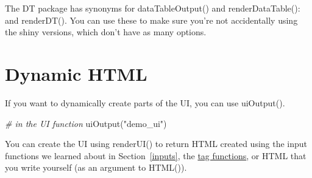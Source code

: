 \documentclass[
]{book}
\newenvironment{Shaded}{\begin{snugshade}}{\end{snugshade}}
\newcommand{\AttributeTok}[1]{\textcolor[rgb]{0.77,0.63,0.00}{#1}}
\newcommand{\CommentTok}[1]{\textcolor[rgb]{0.56,0.35,0.01}{\textit{#1}}}
\newcommand{\DecValTok}[1]{\textcolor[rgb]{0.00,0.00,0.81}{#1}}
\newcommand{\FunctionTok}[1]{\textcolor[rgb]{0.00,0.00,0.00}{#1}}
\newcommand{\NormalTok}[1]{#1}
\newcommand{\OtherTok}[1]{\textcolor[rgb]{0.56,0.35,0.01}{#1}}
\newcommand{\SpecialCharTok}[1]{\textcolor[rgb]{0.00,0.00,0.00}{#1}}
\newcommand{\StringTok}[1]{\textcolor[rgb]{0.31,0.60,0.02}{#1}}
\begin{document}
\begin{Shaded}
\end{Shaded}

The DT package has synonyms for dataTableOutput() and renderDataTable(): and renderDT(). You can use these to make sure you're not accidentally using the shiny versions, which don't have as many options.

\hypertarget{dynamic-html}{%
\section{Dynamic HTML}\label{dynamic-html}}

If you want to dynamically create parts of the UI, you can use uiOutput().

\begin{Shaded}
\begin{Highlighting}[]
\CommentTok{\# in the UI function}
\FunctionTok{uiOutput}\NormalTok{(}\StringTok{"demo\_ui"}\NormalTok{)}
\end{Highlighting}
\end{Shaded}

You can create the UI using renderUI() to return HTML created using the input functions we learned about in Section~\ref{inputs}, the \protect\hyperlink{tags}{tag functions}, or HTML that you write yourself (as an argument to HTML()).

\begin{Shaded}
\end{Shaded}
\end{document}

